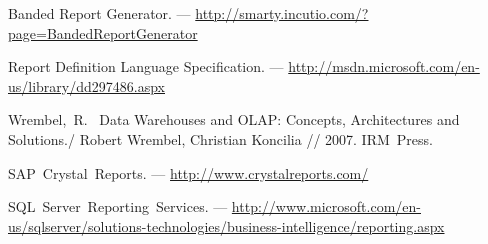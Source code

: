 Banded Report Generator. --- \url{http://smarty.incutio.com/?page=BandedReportGenerator}

Report Definition Language Specification. --- \url{http://msdn.microsoft.com/en-us/library/dd297486.aspx}

Wrembel,~R.~
Data Warehouses and OLAP: Concepts, Architectures and Solutions./
Robert Wrembel, Christian Koncilia //
2007. IRM~Press.

SAP~Crystal~Reports. --- \url{http://www.crystalreports.com/}

SQL~Server~Reporting~Services. --- \url{http://www.microsoft.com/en-us/sqlserver/solutions-technologies/business-intelligence/reporting.aspx}


